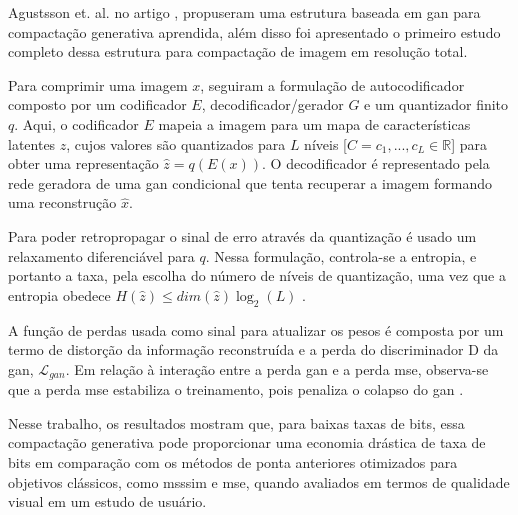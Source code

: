 Agustsson et. al. no artigo \cite{agustsson2019generative}, propuseram uma estrutura baseada em \acrshort{gan} para compactação generativa aprendida, além disso foi apresentado o primeiro estudo completo dessa estrutura para compactação de imagem em resolução total. 

Para comprimir uma imagem $x$, seguiram a formulação de autocodificador composto por um codificador $E$, decodificador/gerador $G$  e um quantizador finito $q$. 
Aqui, o codificador $E$ mapeia a imagem para um mapa de características latentes $z$, cujos valores são quantizados para $L$ níveis [$C = {c_1,. . . , c_L}  \in \mathbb{R}$]  para obter uma representação $\hat{z} = q(E(x))$.
O decodificador é representado pela rede geradora de uma \acrshort{gan} condicional \cite{mirza2014conditional}  que tenta recuperar a imagem formando uma reconstrução $\hat{x}$.

Para poder retropropagar o sinal de erro através da quantização é usado um relaxamento diferenciável para $q$. Nessa formulação, controla-se a entropia, e portanto a taxa, pela escolha do número de níveis de quantização, uma vez que a entropia obedece  $H(\hat{z}) \leq dim(\hat{z}) \log_2(L)$  \cite{agustsson2019generative}. 

A função de perdas usada como sinal para atualizar os pesos é composta por um termo de distorção da informação reconstruída e a perda do discriminador D da \acrshort{gan}, $\mathcal{L}_{gan}$. Em relação à interação entre a perda \acrshort{gan} e a perda \acrshort{mse}, observa-se que a perda \acrshort{mse} estabiliza o treinamento, pois penaliza o colapso do \acrshort{gan} \cite{agustsson2019generative}.

Nesse trabalho, os resultados mostram que, para baixas taxas de bits, essa compactação generativa pode proporcionar uma economia drástica de taxa de bits em comparação com os métodos de ponta anteriores otimizados para objetivos clássicos, como \acrshort{msssim} e \acrshort{mse}, quando avaliados em termos de qualidade visual em um estudo de usuário. 
